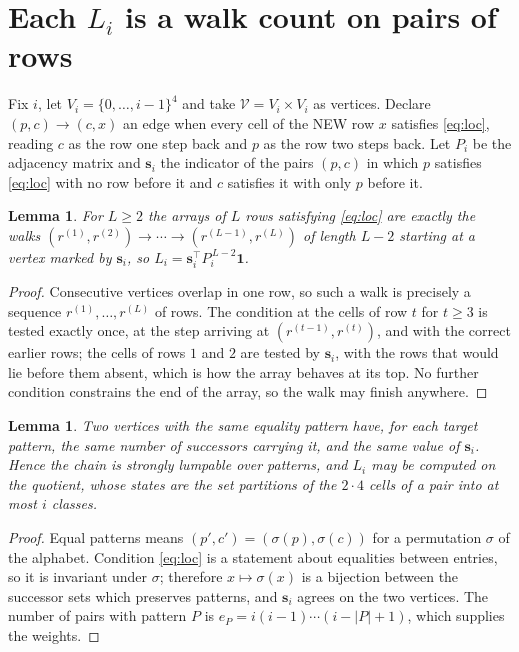 \documentclass[11pt,a4paper]{article}
\theoremstyle{plain}
\newtheorem{lemma}[theorem]{Lemma}
\theoremstyle{definition}
\begin{document}
\section{Each $L_i$ is a walk count on pairs of rows}

Fix $i$, let $V_i=\{0,\dots,i-1\}^{4}$ and take $\mathcal V=V_i\times V_i$ as vertices.
Declare $(p,c)\to(c,x)$ an edge when every cell of the NEW row $x$ satisfies
\eqref{eq:loc}, reading $c$ as the row one step back and $p$ as the row two steps
back. Let $P_i$ be the adjacency matrix and $\mathbf{s}_i$ the indicator of the pairs
$(p,c)$ in which $p$ satisfies \eqref{eq:loc} with no row before it and $c$ satisfies it
with only $p$ before it.

\begin{lemma}\label{lem:walk}
For $L\ge2$ the arrays of $L$ rows satisfying \eqref{eq:loc} are exactly the walks
$(r^{(1)},r^{(2)})\to\cdots\to(r^{(L-1)},r^{(L)})$ of length $L-2$ starting at a
vertex marked by $\mathbf{s}_i$, so
$L_i=\mathbf{s}_i^{\!\top}P_i^{\,L-2}\mathbf{1}$.
\end{lemma}

\begin{proof}
Consecutive vertices overlap in one row, so such a walk is precisely a sequence
$r^{(1)},\dots,r^{(L)}$ of rows. The condition at the cells of row $t$ for $t\ge3$
is tested exactly once, at the step arriving at $(r^{(t-1)},r^{(t)})$, and with the
correct earlier rows; the cells of rows $1$ and $2$ are tested by $\mathbf{s}_i$, with
the rows that would lie before them absent, which is how the array behaves at its top. No
further condition constrains the end of the array, so the walk may finish anywhere.
\end{proof}

\begin{lemma}\label{lem:lump}
Two vertices with the same equality pattern have, for each target pattern, the same number of
successors carrying it, and the same value of $\mathbf{s}_i$. Hence the chain is strongly
lumpable over patterns, and $L_i$ may be computed on the quotient, whose states are the set
partitions of the $2\cdot4$ cells of a pair into at most $i$ classes.
\end{lemma}

\begin{proof}
Equal patterns means $(p',c')=(\sigma(p),\sigma(c))$ for a permutation $\sigma$ of the
alphabet. Condition \eqref{eq:loc} is a statement about equalities between entries, so it is
invariant under $\sigma$; therefore $x\mapsto\sigma(x)$ is a bijection between the successor
sets which preserves patterns, and $\mathbf{s}_i$ agrees on the two vertices. The number of
pairs with pattern $P$ is $e_P=i(i-1)\cdots(i-|P|+1)$, which supplies the weights.
\end{proof}
\end{document}
